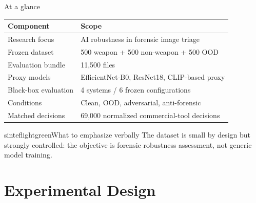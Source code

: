 \documentclass{beamer}
\begin{document}
\begin{frame}{At a glance}

\begin{table}
\centering
\small
\begin{tabular}{@{}ll@{}}
\toprule
\textbf{Component} & \textbf{Scope} \\
\midrule
Research focus & AI robustness in forensic image triage \\
Frozen dataset & 500 weapon + 500 non-weapon + 500 OOD \\
Evaluation bundle & 11,500 files \\
Proxy models & EfficientNet-B0, ResNet18, CLIP-based proxy \\
Black-box evaluation & 4 systems / 6 frozen configurations \\
Conditions & Clean, OOD, adversarial, anti-forensic \\
Matched decisions & 69,000 normalized commercial-tool decisions \\
\bottomrule
\end{tabular}
\end{table}

\begin{colorblock}[black]{sinteflightgreen}{What to emphasize verbally}
The dataset is small by design but strongly controlled: the objective is forensic robustness assessment, not generic model training.
\end{colorblock}

\end{frame}

\section{Experimental Design}
\end{document}
